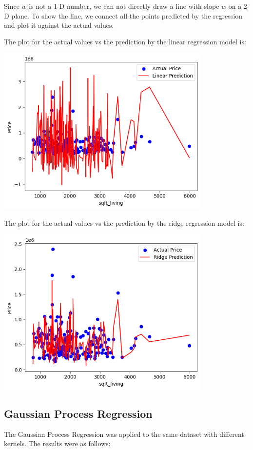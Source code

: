 \documentclass[12pt]{article}
\begin{document}
Since $w$ is not a 1-D number, we can not directly draw a line with slope $w$ on a 2-D plane. To show the line, we connect all the points predicted by the regression and plot it against the actual values.

The plot for the actual values vs the prediction by the linear regression model is:
\begin{center}
    \includegraphics[width=0.8\textwidth]{img/linear.png}
\end{center}

The plot for the actual values vs the prediction by the ridge regression model is:
\begin{center}
    \includegraphics[width=0.8\textwidth]{img/ridge.png}
\end{center}

\subsection{Gaussian Process Regression}
The Gaussian Process Regression was applied to the same dataset with different kernels. The results were as follows:
\end{document}

